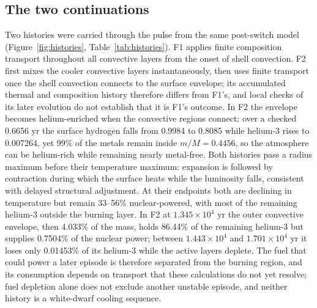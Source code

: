 \subsection{The two continuations}
Two histories were carried through the pulse from the same post-switch
model (Figure~\ref{fig:histories}, Table~\ref{tab:histories}). F1 applies
finite composition transport throughout all convective layers from the onset
of shell convection. F2 first mixes the cooler convective layers
instantaneously, then uses finite transport once the shell convection
connects to the surface envelope; its accumulated thermal and composition
history therefore differs from F1's, and local checks of its later evolution
do not establish that it is F1's outcome. In F2 the envelope becomes
helium-enriched when the convective regions connect: over a checked 0.6656 yr
the surface hydrogen falls from 0.9984 to 0.8085 while helium-3 rises to
0.007264, yet 99\% of the metals remain inside $m/M=0.4456$, so the
atmosphere can be helium-rich while remaining nearly metal-free. Both
histories pass a radius maximum before their temperature maximum: expansion
is followed by contraction during which the surface heats while the
luminosity falls, consistent with delayed structural adjustment. At their
endpoints both are declining in temperature but remain 33--56\%
nuclear-powered, with most of the remaining helium-3 outside the burning
layer. In F2 at $1.345\times10^4$ yr the outer convective envelope, then
4.033\% of the mass, holds 86.44\% of the remaining helium-3 but supplies
0.7504\% of the nuclear power; between $1.443\times10^4$ and
$1.701\times10^4$ yr it loses only 0.01453\% of its helium-3 while the
active layers deplete. The fuel that could power a later episode is
therefore separated from the burning region, and its consumption depends on
transport that these calculations do not yet resolve; fuel depletion alone
does not exclude another unstable episode, and neither history is a
white-dwarf cooling sequence.

